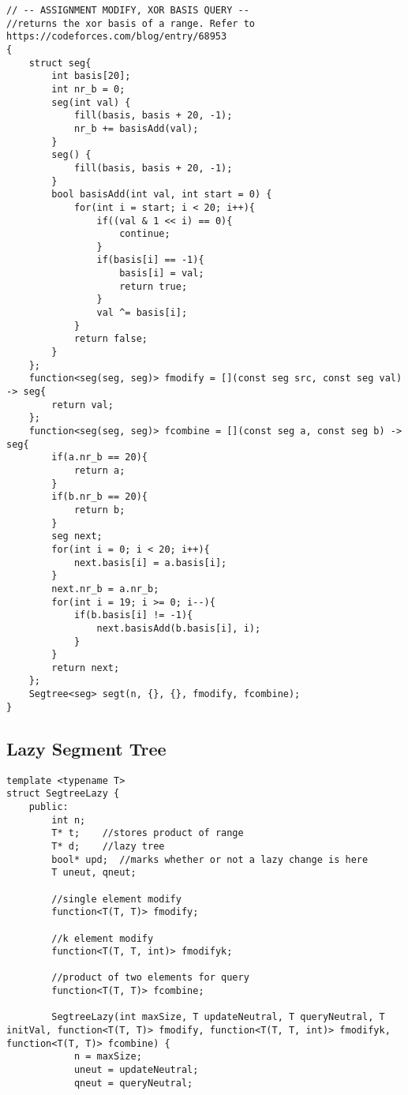 \documentclass[8pt, headheight=10pt]{scrartcl}
\begin{document}
\begin{multicols*}{3}
\begin{lstlisting}
// -- ASSIGNMENT MODIFY, XOR BASIS QUERY --
//returns the xor basis of a range. Refer to https://codeforces.com/blog/entry/68953
{   
    struct seg{
        int basis[20];
        int nr_b = 0;
        seg(int val) {
            fill(basis, basis + 20, -1);
            nr_b += basisAdd(val);
        }
        seg() {
            fill(basis, basis + 20, -1);
        }
        bool basisAdd(int val, int start = 0) {
            for(int i = start; i < 20; i++){
                if((val & 1 << i) == 0){
                    continue;
                }
                if(basis[i] == -1){
                    basis[i] = val;
                    return true;
                }
                val ^= basis[i];
            }
            return false;
        }
    };
    function<seg(seg, seg)> fmodify = [](const seg src, const seg val) -> seg{
        return val;
    };
    function<seg(seg, seg)> fcombine = [](const seg a, const seg b) -> seg{
        if(a.nr_b == 20){
            return a;
        }
        if(b.nr_b == 20){
            return b;
        }
        seg next;
        for(int i = 0; i < 20; i++){
            next.basis[i] = a.basis[i];
        }
        next.nr_b = a.nr_b;
        for(int i = 19; i >= 0; i--){
            if(b.basis[i] != -1){
                next.basisAdd(b.basis[i], i);
            }
        }
        return next;
    };
    Segtree<seg> segt(n, {}, {}, fmodify, fcombine);
}
\end{lstlisting}

\subsection{Lazy Segment Tree}
\begin{lstlisting}
template <typename T>
struct SegtreeLazy {
    public:
        int n;
        T* t;    //stores product of range
        T* d;    //lazy tree
        bool* upd;  //marks whether or not a lazy change is here
        T uneut, qneut;

        //single element modify
        function<T(T, T)> fmodify;

        //k element modify
        function<T(T, T, int)> fmodifyk;

        //product of two elements for query
        function<T(T, T)> fcombine;

        SegtreeLazy(int maxSize, T updateNeutral, T queryNeutral, T initVal, function<T(T, T)> fmodify, function<T(T, T, int)> fmodifyk, function<T(T, T)> fcombine) {
            n = maxSize;
            uneut = updateNeutral;
            qneut = queryNeutral;


\end{lstlisting}
\end{multicols*}
\end{document}

